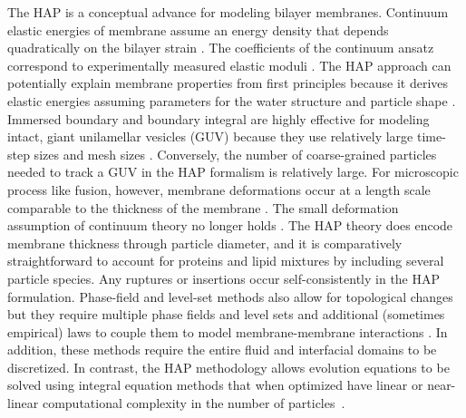 The HAP is a conceptual advance for modeling bilayer membranes.
Continuum elastic energies of membrane assume an energy density that
depends quadratically on the bilayer strain
\cite{Hamm2000,TerziDeserno17, PhysRevE.102.042406}.  The coefficients
of the continuum ansatz correspond to experimentally measured elastic
moduli \cite{Nagle17, Nagle17-2, NAGLE2000159}.  The HAP approach can
potentially explain membrane properties from first principles because it
derives elastic energies assuming parameters for the water structure and
particle shape \cite{Fu2018_SIAM, FuQuRyYo20, doi:10.1063/5.0009734,
LiAn-Chang16}.  Immersed boundary and boundary integral are highly
effective for modeling intact, giant unilamellar vesicles (GUV) because
they use relatively large time-step sizes and mesh sizes
\cite{
Shravan09,
Rahimian15,
KimLai2010_JCP,
KimLai2012_PRE,
HuLaiSeolEtAl2016_JCP,
Bartels,
Peng13,
RyKlYaCo16,
Sinha15,
Lowengrub13,
Hu,
Hu13}.
Conversely, the number of coarse-grained particles needed to track a GUV
in the HAP formalism is relatively large.  For microscopic process like
fusion, however, membrane deformations occur at a length scale
comparable to the thickness of the membrane
\cite{Kuzmin7235,Aeffner2012,KoKo2002}.  The small deformation
assumption of continuum theory no longer holds
\cite{Hamm2000,TerziDeserno17, PhysRevE.102.042406}.  The HAP theory
does encode membrane thickness through particle diameter, and it is
comparatively straightforward to account for proteins and lipid mixtures
by including several particle species.  Any ruptures or insertions occur
self-consistently in the HAP formulation.  Phase-field and level-set
methods also allow for topological changes but they require multiple
phase fields and level sets and additional (sometimes empirical) laws to
couple them to model membrane-membrane interactions
\cite{
DuLiuWang2004_JCP,
BibenKassnerMisbah2005_PRE,
DoyeuxGuyotChabannesEtAl2013_JCAM,
Du05,
QiangDu08,
doi:10.1098/rspa.2012.0505,
doi:10.1137/130941432,
Feetzl18,
doi:10.1137/16M1108406}.
In addition, these methods require the entire fluid and interfacial
domains to be discretized.  In contrast, the HAP methodology allows
evolution equations to be solved using integral equation methods that
when optimized have linear or near-linear computational complexity in
the number of particles~\cite{fmm1, fmm2, fmm3, fmm4, fmm5, fmm6, fmm7,
fmm8}.


